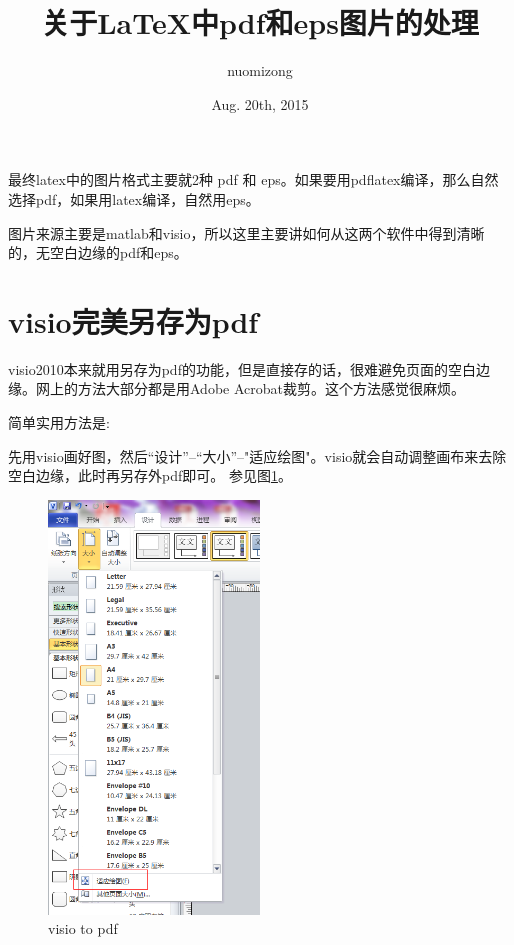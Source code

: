 \documentclass[10pt,a4paper]{article}
\begin{document}
\begin{CJK*}{UTF8}{song}
\author{nuomizong}
\title{关于\LaTeX{}中pdf和eps图片的处理}
\date{Aug. 20th, 2015}
\maketitle

最终latex中的图片格式主要就2种 pdf 和 eps。如果要用pdflatex编译，那么自然选择pdf，如果用latex编译，自然用eps。

图片来源主要是matlab和visio，所以这里主要讲如何从这两个软件中得到清晰的，无空白边缘的pdf和eps。

\section{visio完美另存为pdf}
visio2010本来就用另存为pdf的功能，但是直接存的话，很难避免页面的空白边缘。网上的方法大部分都是用Adobe Acrobat裁剪。这个方法感觉很麻烦。

简单实用方法是:

先用visio画好图，然后“设计”--“大小”--"适应绘图"。visio就会自动调整画布来去除空白边缘，此时再另存外pdf即可。 参见图\ref{fig: visio to pdf}。

\begin{figure}[h]
	\centering
	\includegraphics[width=0.5\textwidth]{visioToPdf}
	\caption{visio to pdf} \label{fig: visio to pdf}
\end{figure}


\end{CJK*}
\end{document}
